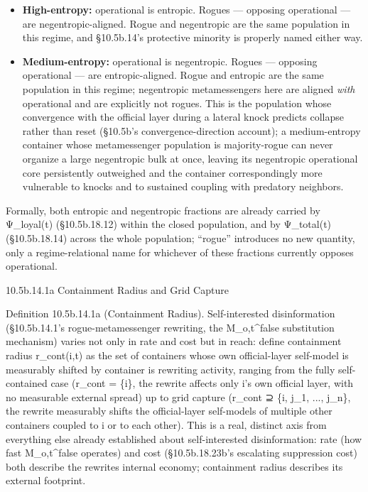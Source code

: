 \documentclass[
]{article}
\begin{document}
\begin{itemize}
\item
  \textbf{High-entropy:} operational is entropic. Rogues --- opposing
  operational --- are negentropic-aligned. Rogue and negentropic are the
  same population in this regime, and §10.5b.14's protective minority is
  properly named either way.
\item
  \textbf{Medium-entropy:} operational is negentropic. Rogues ---
  opposing operational --- are entropic-aligned. Rogue and entropic are
  the same population in this regime; negentropic metamessengers here
  are aligned \emph{with} operational and are explicitly not rogues.
  This is the population whose convergence with the official layer
  during a lateral knock predicts collapse rather than reset (§10.5b's
  convergence-direction account); a medium-entropy container whose
  metamessenger population is majority-rogue can never organize a large
  negentropic bulk at once, leaving its negentropic operational core
  persistently outweighed and the container correspondingly more
  vulnerable to knocks and to sustained coupling with predatory
  neighbors.
\end{itemize}

Formally, both entropic and negentropic fractions are already carried by
Ψ\_loyal(t) (§10.5b.18.12) within the closed population, and by
Ψ\_total(t) (§10.5b.18.14) across the whole population; ``rogue''
introduces no new quantity, only a regime-relational name for whichever
of these fractions currently opposes operational.

10.5b.14.1a Containment Radius and Grid Capture

Definition 10.5b.14.1a (Containment Radius). Self-interested
disinformation (§10.5b.14.1's rogue-metamessenger rewriting, the
M\_o,t\^{}false substitution mechanism) varies not only in rate and cost
but in reach: define containment radius r\_cont(i,t) as the set of
containers whose own official-layer self-model is measurably shifted by
container is rewriting activity, ranging from the fully self-contained
case (r\_cont = \{i\}, the rewrite affects only i's own official layer,
with no measurable external spread) up to grid capture (r\_cont ⊇ \{i,
j\_1, ..., j\_n\}, the rewrite measurably shifts the official-layer
self-models of multiple other containers coupled to i or to each other).
This is a real, distinct axis from everything else already established
about self-interested disinformation: rate (how fast M\_o,t\^{}false
operates) and cost (§10.5b.18.23b's escalating suppression cost) both
describe the rewrites internal economy; containment radius describes its
external footprint.
\end{document}
